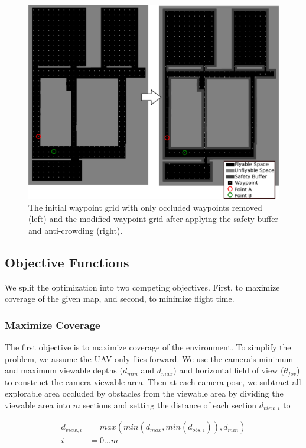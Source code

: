 \documentclass[letterpaper, 10 pt, conference]{ieeeconf}  %
\begin{document}
\begin{figure}
\centering
\includegraphics[width=0.8\linewidth]{figures/waypoint2.png}
\caption{The initial waypoint grid with only occluded waypoints removed (left) and the modified waypoint grid after applying the safety buffer and anti-crowding (right).}
\label{fig:waypoints}
\end{figure}

\subsection{Objective Functions}

We split the optimization into two competing objectives. First, to maximize coverage of the given map, and second, to minimize flight time.

\subsubsection{Maximize Coverage}

The first objective is to maximize coverage of the environment.  To simplify the problem, we assume the UAV only flies forward. We use the camera's minimum and maximum viewable depths ($d_{min}$ and $d_{max}$) and horizontal field of view ($\theta_{fov}$) to construct the camera viewable area. Then at each camera pose, we subtract all explorable area occluded by obstacles from the viewable area by dividing the viewable area into $m$ sections and setting the distance of each section $d_{view,i}$ to

\begin{align}
  d_{view,i} &= max(min(d_{max}, min(d_{obs,i})),d_{min}) \\
  i &= 0...m \nonumber
\end{align}
\end{document}

